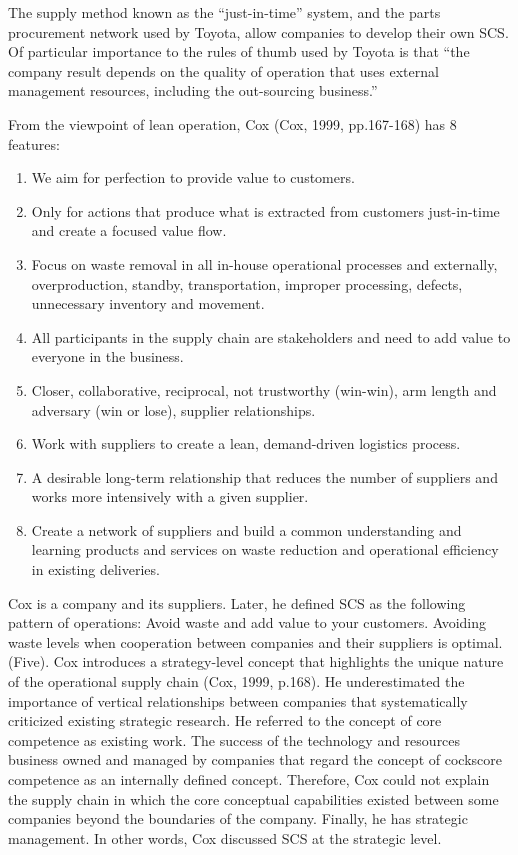 \documentclass[]{article}
\begin{document}
The supply method known as the ``just-in-time'' system, and the parts
procurement network used by Toyota, allow companies to develop their own
SCS. Of particular importance to the rules of thumb used by Toyota is
that ``the company result depends on the quality of operation that uses
external management resources, including the out-sourcing business.''

From the viewpoint of lean operation, Cox (Cox, 1999, pp.167-168) has 8
features:

\begin{enumerate}
\def\labelenumi{(\arabic{enumi})}
\item
  We aim for perfection to provide value to customers.
\item
  Only for actions that produce what is extracted from customers
  just-in-time and create a focused value flow.
\item
  Focus on waste removal in all in-house operational processes and
  externally, overproduction, standby, transportation, improper
  processing, defects, unnecessary inventory and movement.
\item
  All participants in the supply chain are stakeholders and need to add
  value to everyone in the business.
\item
  Closer, collaborative, reciprocal, not trustworthy (win-win), arm
  length and adversary (win or lose), supplier relationships.
\item
  Work with suppliers to create a lean, demand-driven logistics process.
\item
  A desirable long-term relationship that reduces the number of
  suppliers and works more intensively with a given supplier.
\item
  Create a network of suppliers and build a common understanding and
  learning products and services on waste reduction and operational
  efficiency in existing deliveries.
\end{enumerate}

Cox is a company and its suppliers. Later, he defined SCS as the
following pattern of operations: Avoid waste and add value to your
customers. Avoiding waste levels when cooperation between companies and
their suppliers is optimal. (Five). Cox introduces a strategy-level
concept that highlights the unique nature of the operational supply
chain (Cox, 1999, p.168). He underestimated the importance of vertical
relationships between companies that systematically criticized existing
strategic research. He referred to the concept of core competence as
existing work. The success of the technology and resources business
owned and managed by companies that regard the concept of cockscore
competence as an internally defined concept. Therefore, Cox could not
explain the supply chain in which the core conceptual capabilities
existed between some companies beyond the boundaries of the company.
Finally, he has strategic management. In other words, Cox discussed SCS
at the strategic level.
\end{document}
